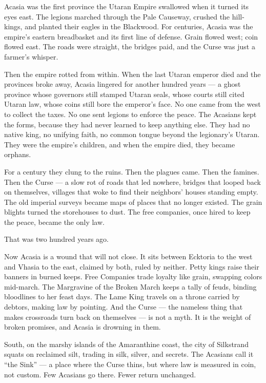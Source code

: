 \vspace{2mm}
\begin{tcolorbox}[colback=black!3,colframe=blue!60!black,title={Theme \& Atmosphere},breakable]
Acasia was the first province the Utaran Empire swallowed when it turned its eyes east. The legions marched through the Pale Causeway, crushed the hill-kings, and planted their eagles in the Blackwood. For centuries, Acasia was the empire's eastern breadbasket and its first line of defense. Grain flowed west; coin flowed east. The roads were straight, the bridges paid, and the Curse was just a farmer's whisper.

Then the empire rotted from within. When the last Utaran emperor died and the provinces broke away, Acasia lingered for another hundred years --- a ghost province whose governors still stamped Utaran seals, whose courts still cited Utaran law, whose coins still bore the emperor's face. No one came from the west to collect the taxes. No one sent legions to enforce the peace. The Acasians kept the forms, because they had never learned to keep anything else. They had no native king, no unifying faith, no common tongue beyond the legionary's Utaran. They were the empire's children, and when the empire died, they became orphans.

For a century they clung to the ruins. Then the plagues came. Then the famines. Then the Curse --- a slow rot of roads that led nowhere, bridges that looped back on themselves, villages that woke to find their neighbors' houses standing empty. The old imperial surveys became maps of places that no longer existed. The grain blights turned the storehouses to dust. The free companies, once hired to keep the peace, became the only law.

That was two hundred years ago.

Now Acasia is a wound that will not close. It sits between Ecktoria to the west and Vhasia to the east, claimed by both, ruled by neither. Petty kings raise their banners in burned keeps. Free Companies trade loyalty like grain, swapping colors mid-march. The Margravine of the Broken March keeps a tally of feuds, binding bloodlines to her feast days. The Lame King travels on a throne carried by debtors, making law by pointing. And the Curse --- the nameless thing that makes crossroads turn back on themselves --- is not a myth. It is the weight of broken promises, and Acasia is drowning in them.

South, on the marshy islands of the Amaranthine coast, the city of Silkstrand squats on reclaimed silt, trading in silk, silver, and secrets. The Acasians call it ``the Sink'' --- a place where the Curse thins, but where law is measured in coin, not custom. Few Acasians go there. Fewer return unchanged.


\end{tcolorbox}
